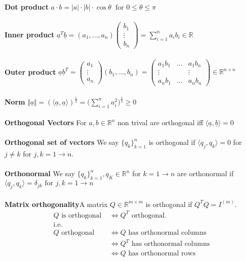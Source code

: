 \documentclass{article}
\begin{document}
\textbf{Dot product}
$
a \cdot b = |a| \cdot |b| \cdot \cos \theta \hspace{7pt} \text{for }0 \leq \theta \leq \pi
$
\\
\\
\textbf{Inner product}
$ \underline{a}^T\underline{b} = ( a_1 , ... ,a_n ) \begin{pmatrix} b_1 \\ \vdots\\ b_n\end{pmatrix} = \sum_{i=1}^n a_ib_i \in \mathbb{R}
$
\\
\\
\textbf{Outer product}
$ \underline{a}\underline{b}^T = \begin{pmatrix} a_1 \\ \vdots\\ a_n\end{pmatrix}( b_1 , ... ,b_n )  = \begin{pmatrix} a_1b_1 & \dots & a_1b_n \\ \vdots &  & \vdots \\ a_nb_1 & \dots & a_nb_n\end{pmatrix}\in \mathbb{R}^{n \times n}
$
\\
\\
\textbf{Norm}
$ \Vert \underline{a} \Vert = (\langle \underline{a}, \underline{a} \rangle )^\frac{1}{2} = \bigg ( \sum_{i=1}^n a_i^2 \bigg )^\frac{1}{2} \geq 0
$
\\
\\
\textbf{Orthogonal Vectors} For $a,b \in \mathbb{R}^n $ non trival are orthogonal iff $\langle \underline{a}, \underline{b} \rangle = 0$
\\
\\
\textbf{Orthogonal set of vectors}
 We say $ \{ q_k \}^n_{k=1}$ is orthogonal if $ \langle q_j, q_k \rangle = 0$ for $j \ne k$ for $j,k = 1 \to n$.
\\
\\
\textbf{Orthonormal}
We say $ \{ q_k \}^n_{k=1}, q_K \in \mathbb{R}^n$ for $k = 1 \to n$ are orthonormal if
$ \langle q_j , q_k \rangle = \delta_{jk} \text{ for } j,k =1 \to n$
\\
\\
\textbf{Matrix orthogonality}A matrix $Q \in \mathbb{R}^{m \times m}$ is orthogonal if $Q^T Q = I^{(m)}$. 
\begin{align*}
    Q \text{ is orthogonal } &\iff Q^T \text{ orthogonal.} \\
    \text{i.e.} \\
Q \text{ orthogonal} &\iff Q \text{ has orthonormal columns}  \\
&\iff Q^T \text{ has orthonormal columns} \\
&\iff Q \text{ has orthonormal rows}
\end{align*}
\end{document}
